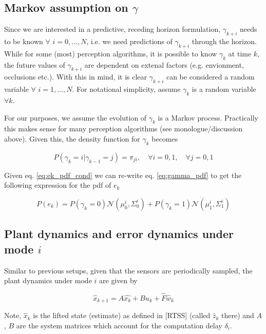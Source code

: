 \documentclass{article}[14pt]
\begin{document}
	\subsection{Markov assumption on $\gamma$}

	Since we are interested in a predictive, receding horizon formulation, $\gamma_{k+i}$ needs to be known $\forall$ $i=0,\dotsc,N$, i.e. we need predictions of $\gamma_{k+i}$ through the horizon. While for some (most) perception algorithms, it is possible to know $\gamma_k$ at time $k$, the future values of $\gamma_{k+i}$ are dependent on extenal factors (e.g. envionment, occlusions etc.). With this in mind, it is clear $\gamma_{k+i}$ can be considered a random variable $\forall$ $i=1,\dotsc,N$. For notational simplicity, assume $\gamma_k$ is a random variable $\forall k$. 

	For our purposes, we assume the evolution of $\gamma_k$ is a Markov process. Practically this makes sense for many perception algorithms (see monologue/discussion above). Given this, the density function for $\gamma_k$ becomes

	\begin{equation}
		P(\gamma_k=i|\gamma_{k-1}=j) = \pi_{ji}, \quad \forall i=0,1,\quad \forall j=0,1
		\label{eq:gamma_pdf}
	\end{equation}

	Given eq. \ref{eq:ek_pdf_cond} we can re-write eq. \ref{eq:gamma_pdf} to get the following expression for the pdf of $e_k$

	\begin{equation}
		P(e_k) = P(\gamma_k=0)\mathcal{N}(\mu^i_0,\Sigma^i_0) + P(\gamma_k=1)\mathcal{N}(\mu^i_1,\Sigma^i_1)
		\label{eq:ek_pdf_exp}
	\end{equation}

	\subsection{Plant dynamics and error dynamics under mode $i$}
	Similar to previous setups, given that the sensors are periodically sampled, the plant dynamics under mode $i$ are given by

	\begin{equation}
		\hat{x}_{k+1} = A\hat{x_k} + Bu_k + \hat{F}\hat{w}_k
		\label{eq:est_dynamics_simple}
	\end{equation}

	Note, $\hat{x}_k$ is the lifted state (estimate) as defined in [RTSS] (called $\hat{z}_k$ there) and $A$, $B$ are the system matrices which account for the computation delay $\delta_i$. 
\end{document}
